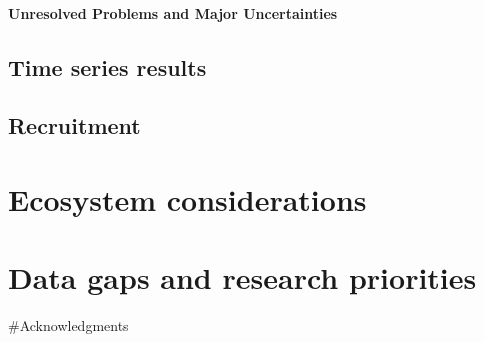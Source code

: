 \documentclass[11pt,
  english,
  a4paper,
]{article}
\begin{document}
\leavevmode\tagmcend\tagstructend


\hypertarget{unresolved-problems-and-major-uncertainties}{%
\paragraph{Unresolved Problems and Major Uncertainties}\label{unresolved-problems-and-major-uncertainties}}

\leavevmode\tagmcend\tagstructend


\hypertarget{time-series-results}{%
\subsection{Time series results}\label{time-series-results}}

\leavevmode\tagmcend\tagstructend


\hypertarget{recruitment}{%
\subsection{Recruitment}\label{recruitment}}

\leavevmode\tagmcend\tagstructend


\hypertarget{ecosystem-considerations}{%
\section{Ecosystem considerations}\label{ecosystem-considerations}}

\leavevmode\tagmcend\tagstructend


\hypertarget{data-gaps-and-research-priorities}{%
\section{Data gaps and research priorities}\label{data-gaps-and-research-priorities}}

\leavevmode\tagmcend\tagstructend


\#Acknowledgments

\leavevmode\tagmcend\tagstructend\par
\end{document}
